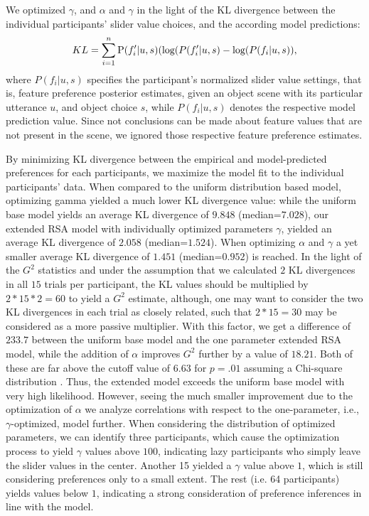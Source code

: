 \documentclass[10pt,a4paper]{article}
\newcommand{\gcs}[1]{\textcolor{blue}{[gcs: #1]}}
\begin{document}

We optimized $\gamma$, and $\alpha$ and $\gamma$ in the light of the KL divergence between the individual participants' slider value choices, and the according model predictions:
$$KL = \sum_{i=1}^{n}\textrm P(f'_i|u,s) (\textrm {log} (P(f'_i|u,s) - \textrm {log} (P(f_i|u,s)),$$
where $P(f_i|u,s)$ specifies the participant's normalized slider value settings, that is, feature preference posterior estimates, given an object scene with its particular utterance $u$, and object choice $s$, while $P(f_i|u,s)$ denotes the respective model prediction value.
Since not conclusions can be made about feature values that are not present in the scene, we ignored those respective feature preference estimates. 


By minimizing KL divergence between the empirical and model-predicted preferences for each participants, we maximize the model fit to the individual participants' data.
When compared to the uniform distribution based model, optimizing gamma yielded a much lower KL divergence value: while the uniform base model yields an average KL divergence of $9.848$ (median=$7.028$), our extended RSA model with individually optimized parameters $\gamma$, yielded an average KL divergence of $2.058$ (median=$1.524$). 
When optimizing $\alpha$ and $\gamma$ a yet smaller average KL divergence of $1.451$ (median=$0.952$) is reached.
In the light of the $G^2$ statistics and under the assumption that we calculated $2$ KL divergences in all $15$ trials per participant, the KL values should be multiplied by $2*15*2=60$ to yield a $G^2$ estimate, although, one may want to consider the two KL divergences in each trial as closely related, such that $2*15=30$ may be considered as a more passive multiplier.
With this factor, we get a difference of $233.7$ between the uniform base model and the one parameter extended RSA model, while the addition of $\alpha$ improves $G^2$ further by a value of $18.21$. Both of these are far above the cutoff value of $6.63$ for $p=.01$ assuming a Chi-square distribution \cite{Lewandowsky:2011}. 
Thus, the extended model exceeds the uniform base model with very high likelihood. 
However, seeing the much smaller improvement due to the optimization of $\alpha$ we analyze correlations with respect to the one-parameter, i.e., $\gamma$-optimized, model further. 
When considering the distribution of optimized parameters, we can identify three participants, which cause the optimization process to yield $\gamma$ values above $100$, indicating lazy participants who simply leave the slider values in the center. 
Another 15 yielded a $\gamma$ value above $1$, which is still considering preferences only to a small extent. The rest (i.e. 64 participants) yields values below $1$, indicating a strong consideration of preference inferences in line with the model. 
 
\end{document}
